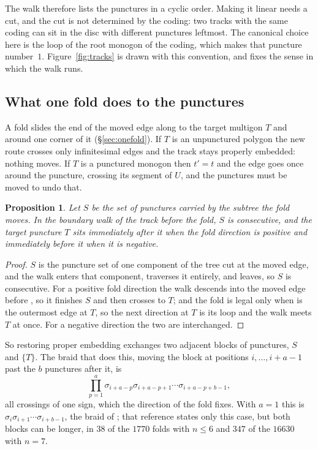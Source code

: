 \documentclass[12pt]{amsart}
\newcommand{\np}{n}                       %
\newcommand{\set}[1]{\{#1\}}
\theoremstyle{plain}
\newtheorem{Proposition}[Theorem]{Proposition}
\theoremstyle{definition}
\begin{document}
The walk therefore lists the punctures in a cyclic order.  Making it
linear needs a cut, and the cut is not determined by the coding: two
tracks with the same coding can sit in the disc with different punctures
leftmost.  The canonical choice here is the loop of the root monogon of
the coding, which makes that puncture number~$1$.  Figure~\ref{fig:tracks}
is drawn with this convention, and fixes the sense in which the walk runs.

\subsection{What one fold does to the punctures}
A fold slides the end of the moved edge along  to the target
multigon $T$ and around one corner of it (\S\ref{sec:onefold}).  If $T$ is
an unpunctured polygon the new route crosses only infinitesimal edges and
the track stays properly embedded: nothing moves.  If $T$ is a punctured
monogon then $t'=t$ and the edge goes once around the puncture, crossing
its segment of $U$, and the punctures must be moved to undo that.

\begin{Proposition}
\label{prop:adjacent}
Let $S$ be the set of punctures carried by the subtree the fold moves.
In the boundary walk of the track before the fold, $S$ is consecutive,
and the target puncture $T$ sits immediately after it when the fold direction is
positive and immediately before it when it is negative.
\end{Proposition}

\begin{proof}
$S$ is the puncture set of one component of the tree cut at the moved
edge, and the walk enters that component, traverses it entirely, and
leaves, so $S$ is consecutive.  For a positive fold direction the walk
descends into the moved edge before , so it finishes $S$ and
then crosses to $T$; and the fold is legal only when  is the
outermost edge at $T$, so the next direction at $T$ is its loop and the
walk meets $T$ at once.  For a negative direction the two are interchanged.
\end{proof}

So restoring proper embedding exchanges two adjacent blocks of punctures,
$S$ and $\set{T}$.  The braid that does this, moving the block at
positions $i,\dots,i+a-1$ past the $b$ punctures after it, is
\begin{equation}
  \label{eq:blockswap}
  \prod_{p=1}^{a} \sigma_{i+a-p} \sigma_{i+a-p+1} \cdots
  \sigma_{i+a-p+b-1},
\end{equation}
all crossings of one sign, which the direction of the fold fixes.  With
$a = 1$ this is $\sigma_i \sigma_{i+1} \cdots \sigma_{i+b-1}$, the braid
of \cite[Prop.~2.4]{Lanneau2011}; that reference states only this case,
but both blocks can be longer, in $38$ of the $1770$ folds with $\np \le
6$ and $347$ of the $16630$ with $\np = 7$.
\end{document}
